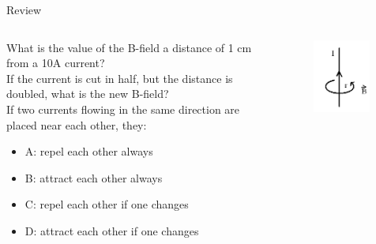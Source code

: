 \documentclass{beamer}
\begin{document}
\begin{frame}{Review}
\begin{columns}[T]
\begin{column}{0.65\textwidth}
\small
What is the value of the B-field a distance of 1 cm from a 10A current? \\ \vspace{0.5cm}
If the current is cut in half, but the distance is doubled, what is the new B-field? \\ \vspace{0.5cm}
If two currents flowing in the same direction are placed near each other, they:
\begin{itemize}
\item A: repel each other always
\item B: attract each other always
\item C: repel each other if one changes
\item D: attract each other if one changes
\end{itemize}
\end{column}
\begin{column}{0.35\textwidth}
\begin{figure}
\centering
\includegraphics[width=0.95\textwidth]{ex5.png}
\caption{\label{fig:ex5}}
\end{figure}
\end{column}
\end{columns}
\end{frame}
\end{document}
